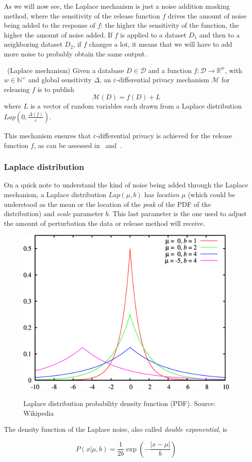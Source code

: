 As we will now see, the Laplace mechanism is just a noise addition masking method, where the sensitivity of the release function $f$ drives the amount of noise being added to the response of $f$: the higher the sensitivity of the function, the higher the amount of noise added. If $f$ is applied to a dataset $D_1$ and then to a neighboring dataset $D_2$, if $f$ changes a lot, it means that we will have to add more noise to probably obtain the same output.

\begin{definition}~(Laplace mechanism)
Given a database $D \in \mathcal{D}$ and a function $f : \mathcal{D} \rightarrow \mathbb{R}^w$, with $w \in \mathbb{N}^+$ and global sensitivity $\Delta$, an $\varepsilon$-differential privacy mechanism $\mathcal{M}$ for releasing $f$ is to publish
\begin{equation}
\mathcal{M}(D) = f(D) + L
\end{equation}
where $L$ is a vector of random variables each drawn from a Laplace distribution $Lap(0, \frac{\Delta(f)}{\varepsilon})$.
\end{definition}

This mechanism ensures that $\varepsilon$-differential privacy is achieved for the release function $f$, as can be assessed in~\citet{Leoni:NonInteractiveDiffPriv} and~\citet{Domingo:EnhancingDiffPrivMicroaggregation}.

\subsubsection*{Laplace distribution}

On a quick note to understand the kind of noise being added through the Laplace mechanism, a Laplace distribution $Lap(\mu, b)$ has \textit{location} $\mu$ (which could be understood as the mean or the location of the \textit{peak} of the PDF of the distribution) and \textit{scale} parameter $b$. This last parameter is the one used to adjust the amount of perturbation the data or release method will receive.

\begin{figure}[h]
	\centering
	\includegraphics[width=0.5\linewidth]{figures/laplace-pdf.png}
	\label{fig:laplace-pdf}
	\caption[Laplace distribution.]{Laplace distribution probability density function (PDF). Source: Wikipedia~\cite{web:Wiki:LaplaceDist}}
\end{figure}

The density function of the Laplace noise, also called \textit{double exponential}, is

\begin{equation}
P(x|\mu,b) = \frac{1}{2b}\exp(-\frac{|x-\mu|}{b})
\end{equation}






